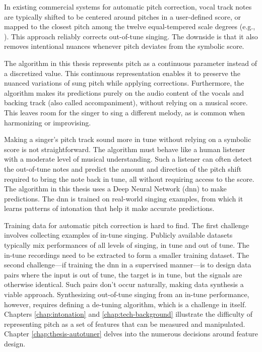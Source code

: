 In existing commercial systems for automatic pitch correction, vocal track notes are typically shifted to be centered around pitches in a user-defined score, or mapped to the closest pitch among the twelve equal-tempered scale degrees (e.g., \cite{antares:2018}). This approach reliably corrects out-of-tune singing. The downside is that it also removes intentional nuances whenever pitch deviates from the symbolic score. 

The algorithm in this thesis represents pitch as a continuous parameter instead of a discretized value. This continuous representation enables it to preserve the nuanced variations of sung pitch while applying corrections. Furthermore, the algorithm makes its predictions purely on the audio content of the vocals and backing track (also called accompaniment), without relying on a musical score. This leaves room for the singer to sing a different melody, as is common when harmonizing or improvising. %

Making a singer's pitch track sound more in tune without relying on a symbolic score is not straightforward. The algorithm must behave like a human listener with a moderate level of musical understanding. Such a listener can often detect the out-of-tune notes and predict the amount and direction of the pitch shift required to bring the note back in tune, all without requiring access to the score. The algorithm in this thesis uses a Deep Neural Network (\gls{dnn}) to make predictions. The \gls{dnn} is trained on real-world singing examples, from which it learns patterns of intonation that help it make accurate predictions.

Training data for automatic pitch correction is hard to find. The first challenge involves collecting examples of in-tune singing. Publicly available datasets typically mix performances of all levels of singing, in tune and out of tune. The in-tune recordings need to be extracted to form a smaller training dataset. The second challenge---if training the \gls{dnn} in a supervised manner---is to design data pairs where the input is out of tune, the target is in tune, but the signals are otherwise identical. Such pairs don't occur naturally, making data synthesis a viable approach. Synthesizing out-of-tune singing from an in-tune performance, however, requires defining a de-tuning algorithm, which is a challenge in itself. Chapters \ref{chap:intonation} and \ref{chap:tech-background} illustrate the difficulty of representing pitch as a set of features that can be measured and manipulated. Chapter \ref{chap:thesis-autotuner} delves into the numerous decisions around feature design. 

